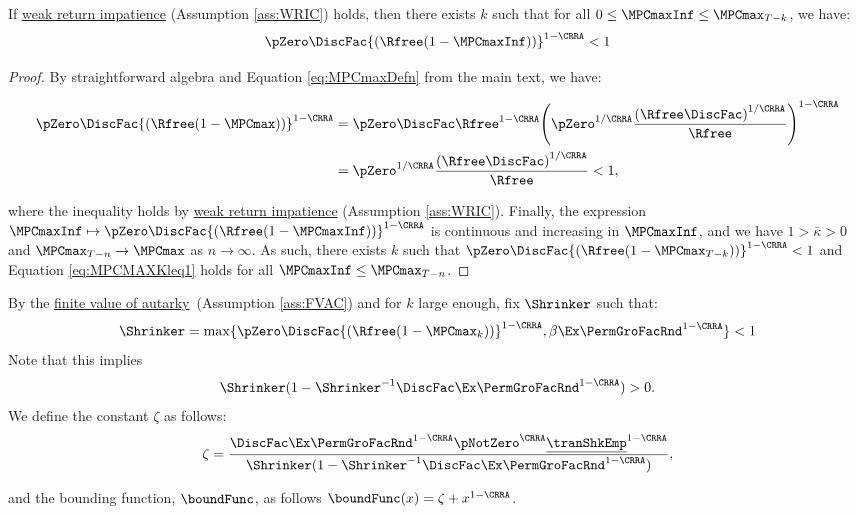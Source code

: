 \documentclass[\econtexRoot/BufferStockTheory]{subfiles}
\begin{document}
\begin{claim}\label{claim:MPCMAXKleq1}
If \hyperlink{WRIC}{weak return impatience} (Assumption \ref{ass:WRIC}) holds, then there exists $k$ such that for all $0\leq\MPCmaxInf\leq \MPCmax_{T-k}$, we have:
%
\begin{equation}\label{eq:MPCMAXKleq1}
  \pZero \DiscFac {(\Rfree (1-\MPCmaxInf))}^{1-\CRRA}   < 1
\end{equation}
%
\end{claim}
\begin{proof}

By straightforward algebra and Equation \eqref{eq:MPCmaxDefn} from the main text, we have:

\begin{align}
\pZero \DiscFac {(\Rfree (1-\MPCmax))}^{1-\CRRA}  & = \pZero\DiscFac\Rfree^{1-\CRRA}{\left(\pZero^{1/\CRRA}\frac{{(\Rfree\DiscFac)}^{1/\CRRA}}{\Rfree}\right)}^{1-\CRRA} \\\notag
& = \pZero^{1/\CRRA}\frac{{(\Rfree\DiscFac)}^{1/\CRRA}}{\Rfree} <1 \notag,
\end{align}

where the inequality holds by \hyperlink{WRIC}{weak return impatience} (Assumption \ref{ass:WRIC}).
Finally, the expression $\MPCmaxInf\mapsto \pZero \DiscFac {(\Rfree (1-\MPCmaxInf))}^{1-\CRRA} $ is continuous and increasing in $\MPCmaxInf$, and we have $1>\bar{\kappa}>0$ and $\MPCmax_{T-n} \rightarrow \MPCmax$ as $n\rightarrow\infty$.
As such, there exists $k$ such that $\pZero \DiscFac {(\Rfree (1-\MPCmax_{T-k}))}^{1-\CRRA}<1$ and Equation \eqref{eq:MPCMAXKleq1} holds for all $\MPCmaxInf\leq \MPCmax_{T-n}$.


\end{proof}


\begin{remark}\label{rem:shnkrdef}
By the \hyperlink{FVAC}{finite value of autarky}~(Assumption \ref{ass:FVAC}) and for $k$ large enough, fix $\Shrinker$ such that:
%
\begin{equation}\label{eq:shnkrdef}
\Shrinker = \max\{\pZero \DiscFac {(\Rfree (1-\MPCmax_{k}))}^{1-\CRRA},\beta\Ex\PermGroFacRnd^{1-\CRRA}\}<1
\end{equation}
%
Note that this implies
%
\begin{equation}\label{eq:shrnkrCond}
\Shrinker(1- \Shrinker^{-1}\DiscFac \Ex\PermGroFacRnd^{1-\CRRA })>0. 
\end{equation}
%
We define the constant $\zeta$ as follows:
%
\begin{equation}\label{eq:Mbarddef}
\zeta = \frac{\DiscFac \Ex \PermGroFacRnd^{1-\CRRA }\pNotZero^{\CRRA}\underline{\tranShkEmp}^{1-\CRRA}}{\Shrinker(1- \Shrinker^{-1}\DiscFac \Ex \PermGroFacRnd^{1-\CRRA })}, 
\end{equation}

and the bounding function, $\boundFunc$, as follows $\boundFunc(x) = \zeta +  x^{1-\CRRA}$.


\end{remark}
\end{document}

